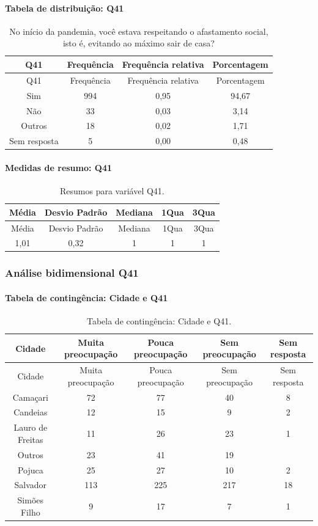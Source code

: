 \documentclass[]{article}
\let\oldparagraph\paragraph
\renewcommand{\paragraph}[1]{\oldparagraph{#1}\mbox{}}
\begin{document}
\hypertarget{tabela-de-distribuiuxe7uxe3o-q41}{%
\paragraph{Tabela de distribuição: Q41}\label{tabela-de-distribuiuxe7uxe3o-q41}}

\begin{longtable}[]{@{}cccc@{}}
\caption{\label{tab:unnamed-chunk-1603}No início da pandemia, você estava respeitando o afastamento social, isto é, evitando ao máximo sair de casa?}\tabularnewline
\toprule
Q41 & Frequência & Frequência relativa & Porcentagem\tabularnewline
\midrule
\endfirsthead
\toprule
Q41 & Frequência & Frequência relativa & Porcentagem\tabularnewline
\midrule
\endhead
Sim & 994 & 0,95 & 94,67\tabularnewline
Não & 33 & 0,03 & 3,14\tabularnewline
Outros & 18 & 0,02 & 1,71\tabularnewline
Sem resposta & 5 & 0,00 & 0,48\tabularnewline
\bottomrule
\end{longtable}

\hypertarget{medidas-de-resumo-q41}{%
\paragraph{Medidas de resumo: Q41}\label{medidas-de-resumo-q41}}

\begin{longtable}[]{@{}ccccc@{}}
\caption{\label{tab:unnamed-chunk-1604}Resumos para variável Q41.}\tabularnewline
\toprule
Média & Desvio Padrão & Mediana & 1Qua & 3Qua\tabularnewline
\midrule
\endfirsthead
\toprule
Média & Desvio Padrão & Mediana & 1Qua & 3Qua\tabularnewline
\midrule
\endhead
1,01 & 0,32 & 1 & 1 & 1\tabularnewline
\bottomrule
\end{longtable}

\cleardoublepage

\hypertarget{anuxe1lise-bidimensional-q41}{%
\subsubsection{Análise bidimensional Q41}\label{anuxe1lise-bidimensional-q41}}

\hypertarget{tabela-de-continguxeancia-cidade-e-q41}{%
\paragraph{Tabela de contingência: Cidade e Q41}\label{tabela-de-continguxeancia-cidade-e-q41}}

\begin{longtable}[]{@{}ccccc@{}}
\caption{\label{tab:unnamed-chunk-1605}Tabela de contingência: Cidade e Q41.}\tabularnewline
\toprule
Cidade & Muita preocupação & Pouca preocupação & Sem preocupação & Sem resposta\tabularnewline
\midrule
\endfirsthead
\toprule
Cidade & Muita preocupação & Pouca preocupação & Sem preocupação & Sem resposta\tabularnewline
\midrule
\endhead
Camaçari & 72 & 77 & 40 & 8\tabularnewline
Candeias & 12 & 15 & 9 & 2\tabularnewline
Lauro de Freitas & 11 & 26 & 23 & 1\tabularnewline
Outros & 23 & 41 & 19 &\tabularnewline
Pojuca & 25 & 27 & 10 & 2\tabularnewline
Salvador & 113 & 225 & 217 & 18\tabularnewline
Simões Filho & 9 & 17 & 7 & 1\tabularnewline
\bottomrule
\end{longtable}
\end{document}

